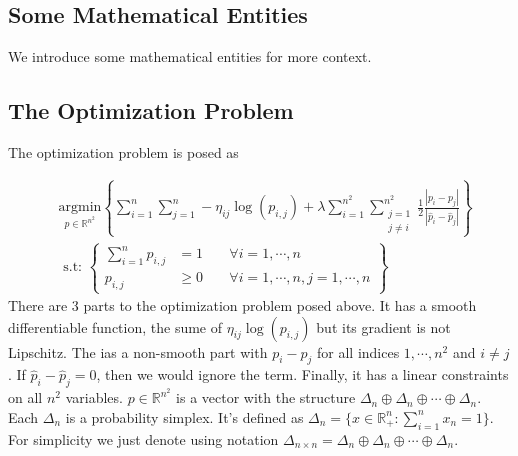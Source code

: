 \documentclass[11pt]{article}
\theoremstyle{definition}
\numberwithin{equation}{subsection}
\begin{document}
    \subsection{Some Mathematical Entities}
        We introduce some mathematical entities for more context. 

    \subsection{The Optimization Problem}
    \begin{linenumbers}
        The optimization problem is posed as 
    \end{linenumbers}
        \begin{align}
            &\underset{p \in \mathbb R^{n^2}}{\text{argmin}} 
            \left\lbrace
                \sum_{i = 1}^{n}\sum_{j = 1}^{n}
                    -\eta_{ij}\log(p_{i, j})
                + 
                \lambda \sum_{i=1}^{n^2}\sum_{\substack{j=1\\j\neq i}}^{n^2}
                \frac{1}{2}
                \frac{|p_{i} - p_j|}{|\hat p_{i} - \hat p_j|}
                \right\rbrace
                \\
                &\text{ s.t: }
                \left\lbrace
                \begin{aligned}
                    \sum_{i = 1}^{n} p_{i, j} &= 1 \; && \forall i =1, \cdots, n 
                    \\
                    p_{i, j} &\ge 0\; &&\forall i= 1,\cdots, n, j = 1,\cdots, n 
                \end{aligned}
                \right\rbrace
            \label{eqn:original_formulaion}
        \end{align}
        There are 3 parts to the optimization problem posed above. 
        It has a smooth differentiable function, the sume of $\eta_{ij}\log(p_{i,j})$ but its gradient is not Lipschitz. 
        The ias a non-smooth part with $p_i - p_j$ for all indices $1,\cdots, n^2$ and $i\neq j$. 
        If $\hat p_i - \hat p_j = 0$, then we would ignore the term. 
        Finally, it has a linear constraints on all $n^2$ variables. 
        $p\in \mathbb R^{n^2}$ is a vector with the structure $\Delta_n\oplus\Delta_n\oplus \cdots \oplus \Delta_n$. 
        Each $\Delta_n$ is a probability simplex. 
        It's defined as $\Delta_n = \{x\in \mathbb R^n_+ : \sum_{i =1}^{n}x_n = 1\}$. 
        For simplicity we just denote using notation $\Delta_{n\times n} = \Delta_n\oplus\Delta_n\oplus \cdots \oplus \Delta_n$. 
        
\end{document}
